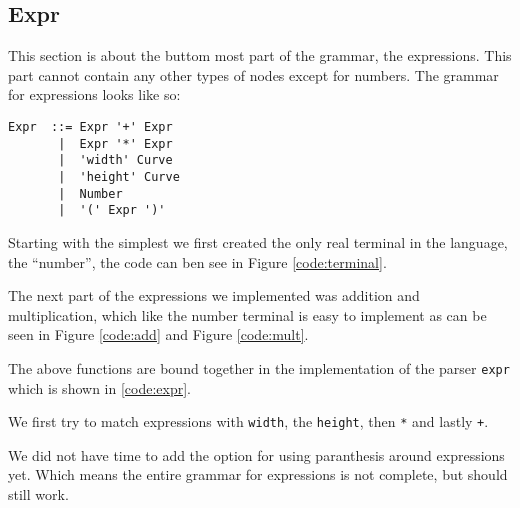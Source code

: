 \subsection{Expr}

This section is about the buttom most part of the grammar, the expressions. This
part cannot contain any other types of nodes except for numbers. The grammar for
expressions looks like so:
\begin{verbatim}
Expr  ::= Expr '+' Expr
       |  Expr '*' Expr
       |  'width' Curve
       |  'height' Curve
       |  Number
       |  '(' Expr ')'
\end{verbatim}

Starting with the simplest we first created the only real terminal in the
language, the ``number'', the code can ben see in Figure \ref{code:terminal}.


The next part of the expressions we implemented was addition and multiplication,
which like the number terminal is easy to implement as can be seen in Figure
\ref{code:add} and Figure \ref{code:mult}.


The above functions are bound together in the implementation of the parser
\texttt{expr} which is shown in \ref{code:expr}.


We first try to match expressions with \texttt{width}, the \texttt{height}, then
\texttt{*} and lastly \texttt{+}.

We did not have time to add the option for using paranthesis around expressions
yet. Which means the entire grammar for expressions is not complete, but should
still work.

